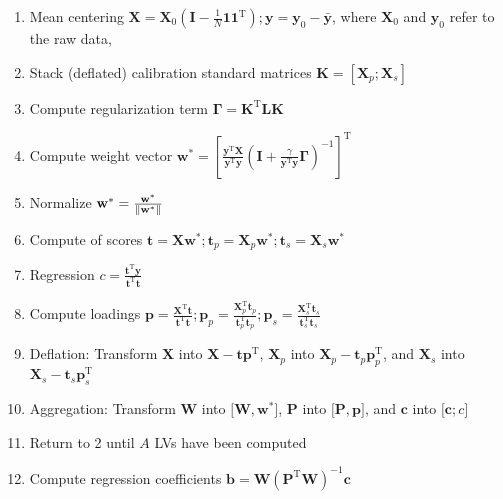 \documentclass{article}
\newcommand{\T }{^{\text{T}}}
\DeclarePairedDelimiter{\normtwo}{\lVert}{\rVert}
\let\vec\mathbf
\begin{document}
\begin{enumerate}
	\item Mean centering $\vec X = \vec X_0(\vec I -\frac{1}{N}\boldsymbol{1}\boldsymbol{1}\T) ; \vec y = \vec y_0 - \bar{\vec y}$, where $ \vec X_0$ and $\vec y_0$ refer to the raw data,
	\item Stack (deflated) calibration standard matrices $\vec K = [\vec X_p;\vec X_s]$
	\item Compute regularization term $\boldsymbol{\Gamma} = \vec K\T\vec L\vec K$  
	\item Compute weight vector $\vec w^{*} = \left[\frac{\vec y\T\vec X}{\vec y\T\vec y}\left(\vec I + \frac{\gamma}{\vec y\T\vec y}\boldsymbol{\Gamma}\right)^{-1}\right]\T$
	\item Normalize $\vec w^{*} = \frac{\vec w^{*}}{\normtwo{\vec w^{*}}}$
	\item Compute of scores $\vec t = \vec X\vec w^* ; \vec t_p = \vec X_p\vec w^* ; \vec t_s = \vec X_s\vec w^*$
	\item Regression $c = \frac{\vec t\T \vec y}{\vec t\T\vec t}$
	\item Compute loadings $\vec p = \frac{\vec X\T\vec t}{\vec t\T\vec t} ; \vec p_p = \frac{\vec X_p\T\vec t_p}{\vec t_p\T\vec t_p} ; \vec p_s = \frac{\vec X_s\T\vec t_s}{\vec t_s\T\vec t_s}$
	\item Deflation: Transform $\vec X$ into $ \vec X - \vec t\vec p\T$, $\vec X_p$ into $\vec X_p - \vec t_p\vec p_p\T$, and $\vec X_s$ into $  \vec X_s - \vec t_s\vec p_s\T$
	\item Aggregation: Transform $\vec W$ into $\vec [\vec W, \vec w^*] $, $\vec P$ into  $ \vec [\vec P, \vec p] $, and $\vec c$ into $\vec [\vec c; c]$
	\item Return to 2 until $A$ LVs have been computed
	\item Compute regression coefficients $\vec b = \vec W(\vec P\T\vec W)^{-1}\vec c$
\end{enumerate}
\end{document}
